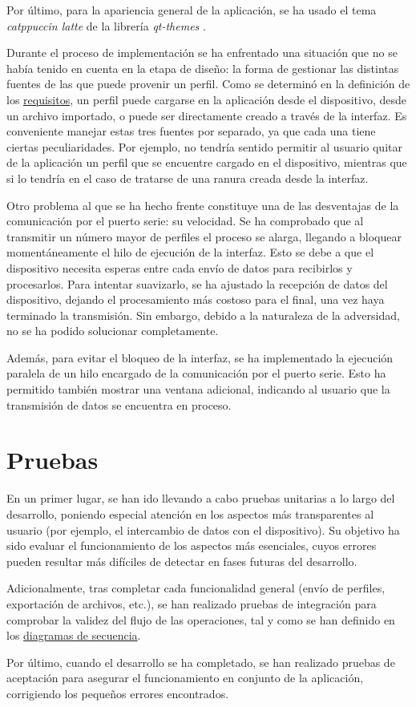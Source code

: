 Por último, para la apariencia general de la aplicación, se ha usado el tema \textit{catppuccin latte} de la librería \textit{qt-themes} \cite{qtthemes-lib}.

Durante el proceso de implementación se ha enfrentado una situación que no se había tenido en cuenta en la etapa de diseño: la forma de gestionar las distintas fuentes de las que puede provenir un perfil. Como se determinó en la definición de los \hyperref[subsub:ui_requisitos]{requisitos}, un perfil puede cargarse en la aplicación desde el dispositivo, desde un archivo importado, o puede ser directamente creado a través de la interfaz. Es conveniente manejar estas tres fuentes por separado, ya que cada una tiene ciertas peculiaridades. Por ejemplo, no tendría sentido permitir al usuario quitar de la aplicación un perfil que se encuentre cargado en el dispositivo, mientras que si lo tendría en el caso de tratarse de una ranura creada desde la interfaz.

Otro problema al que se ha hecho frente constituye una de las desventajas de la comunicación por el puerto serie: su velocidad. Se ha comprobado que al transmitir un número mayor de perfiles el proceso se alarga, llegando a bloquear momentáneamente el hilo de ejecución de la interfaz. Esto se debe a que el dispositivo necesita esperas entre cada envío de datos para recibirlos y procesarlos. Para intentar suavizarlo, se ha ajustado la recepción de datos del dispositivo, dejando el procesamiento más costoso para el final, una vez haya terminado la transmisión. Sin embargo, debido a la naturaleza de la adversidad, no se ha podido solucionar completamente.

Además, para evitar el bloqueo de la interfaz, se ha implementado la ejecución paralela de un hilo encargado de la comunicación por el puerto serie. Esto ha permitido también mostrar una ventana adicional, indicando al usuario que la transmisión de datos se encuentra en proceso.

\section{Pruebas}

En un primer lugar, se han ido llevando a cabo pruebas unitarias a lo largo del desarrollo, poniendo especial atención en los aspectos más transparentes al usuario (por ejemplo, el intercambio de datos con el dispositivo). Su objetivo ha sido evaluar el funcionamiento de los aspectos más esenciales, cuyos errores pueden resultar más difíciles de detectar en fases futuras del desarrollo.

Adicionalmente, tras completar cada funcionalidad general (envío de perfiles, exportación de archivos, etc.), se han realizado pruebas de integración para comprobar la validez del flujo de las operaciones, tal y como se han definido en los \hyperref[fig:ui_recargar]{diagramas de secuencia}.

Por último, cuando el desarrollo se ha completado, se han realizado pruebas de aceptación para asegurar el funcionamiento en conjunto de la aplicación, corrigiendo los pequeños errores encontrados.
